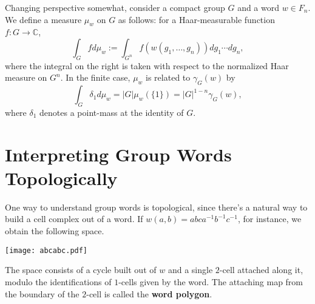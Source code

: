 \documentclass[12pt]{article}
\newcommand{\C}{\mathbb{C}}
\newcommand{\be}{\begin{equation}}
\newcommand{\ee}{\end{equation}}
\begin{document}
Changing perspective somewhat, consider a compact group $G$ and a word $w \in F_n$.  We define a measure $\mu_w$ on $G$ as follows: for a Haar-measurable function $f : G \to \C$,
\be 
\int_G f d\mu_w := \int_{G^n} f(w(g_1, \ldots, g_n))dg_1 \cdots dg_n,
\ee
where the integral on the right is taken with respect to the normalized Haar measure on $G^n$.  In the finite case, $\mu_w$ is related to $\gamma_G(w)$ by
\be 
\int_G \delta_1 d\mu_w = |G|\mu_w(\{1\}) = |G|^{1-n} \gamma_G(w),
\ee
where $\delta_1$ denotes a point-mass at the identity of $G$.  

\section{Interpreting Group Words Topologically}

\noindent One way to understand group words is topological, since there's a natural way to build a cell complex out of a word.  If $w(a,b)=abca^{-1}b^{-1}c^{-1}$, for instance, we obtain the following space.

\begin{center} \texttt{[image: abcabc.pdf]} \end{center}

\noindent The space consists of a cycle built out of $w$ and a single $2$-cell attached along it, modulo the identifications of $1$-cells given by the word.  The attaching map from the boundary of the $2$-cell is called the \textbf{word polygon}.

\end{document}
